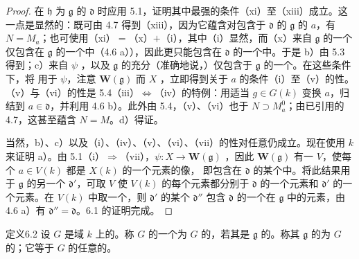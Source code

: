 \begin{proof}
在 $\mathfrak h$ 为 $\mathfrak g$ 的 $\mathfrak d$ 时应用 5.1，证明其中最强的条件（xi）至（xiii）成立。这一点是显然的：既可由 4.7 得到（xiii），因为它蕴含对包含于 $\mathfrak d$ 的 $\mathfrak g$ 的 $a$，有 $N=M_a$；也可使用（xi）$=$（x）$+$（i），其中（i）显然，而（x）来自 $\mathfrak g$ 的一个仅包含在 $\mathfrak g$ 的一个中（4.6 a）），因此更只能包含在 $\mathfrak d$ 的一个中。于是 b）由 5.3 得到；c）来自 $\psi$ ，以及 $\mathfrak g$ 的充分（准确地说，）仅包含于 $\mathfrak g$ 的一个。在这些条件下，将 用于 $\psi$，注意 $\mathbf W(\mathfrak g)$ 而 $X$ ，立即得到关于 $a$ 的条件（i）至（v）的性。（v）与（vi）的性是 5.4（iii）$\Leftrightarrow$（iv）的特例：用适当 $g\in G(k)$ 变换 $a$，归结到 $a\in\mathfrak d$，并利用 4.6 b）。此外由 5.4，（v）、（vi）也于 $N\supset M_a^0$；由已引用的 4.7，这甚至蕴含 $N=M$。d）得证。

当然，b）、c）以及（i）、（iv）、（v）、（vi）、（vii）的性对任意仍成立。现在使用 $k$ 来证明 a）。由 5.1（i）$\Rightarrow$（vii），$\psi:X\to\mathbf W(\mathfrak g)$ ，因此 $\mathbf W(\mathfrak g)$ 有一 $V$，使每个 $a\in V(k)$ 都是 $X(k)$ 的一个元素的像，
即包含在 $\mathfrak d$ 的某个中。将此结果用于 $\mathfrak g$ 的另一个 $\mathfrak d'$，可取 $V$ 使 $V(k)$ 的每个元素都分别于 $\mathfrak d$ 的一个元素和 $\mathfrak d'$ 的一个元素。在 $V(k)$ 中取一个，则 $\mathfrak d'$ 的某个 $\mathfrak d''$ 包含 $\mathfrak d$ 的一个在 $\mathfrak g$ 中的元素，由 4.6 a）有 $\mathfrak d''=\mathfrak d$。6.1 的证明完成。
\end{proof}
\begin{SGAresult}{定义}{6.2}
设 $G$ 是域 $k$ 上的。称 $G$ 的一个为 $G$ 的，若其是 $\mathfrak g$ 的。称其 $\mathfrak g$ 的为 $G$ 的；它等于 $G$ 的任意的。
\end{SGAresult}
